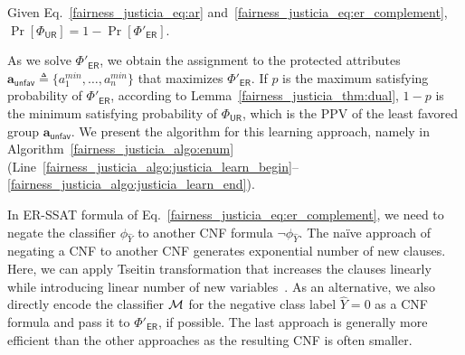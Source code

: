 \begin{lemma}\label{fairness_justicia_thm:dual}
Given Eq.~\eqref{fairness_justicia_eq:ar} and~\eqref{fairness_justicia_eq:er_complement},	$ \Pr[\Phi_{\mathsf{UR}}] = 1 - \Pr[\Phi'_{\mathsf{ER}}]  $.
\end{lemma}
As we solve $\Phi'_{\mathsf{ER}}$, we obtain the assignment to the protected attributes $\mathbf{a}_{\mathsf{unfav}} \triangleq \{a^{min}_1, \dots, a^{min}_n\}$ that maximizes $\Phi'_{\mathsf{ER}}$. 
If $ p $ is the maximum satisfying probability of $ \Phi'_{\mathsf{ER}} $, according to Lemma~\ref{fairness_justicia_thm:dual}, $ 1 - p $ is the minimum satisfying probability of $ \Phi_{\mathsf{UR}} $,  which is the PPV of the least favored group $ \mathbf{a}_{\mathsf{unfav}}$. We present the algorithm for this learning approach, namely {\justicialearn} in Algorithm~\ref{fairness_justicia_algo:enum} (Line~\ref{fairness_justicia_algo:justicia_learn_begin}--\ref{fairness_justicia_algo:justicia_learn_end}).

\iffalse
\begin{algorithm}[t!]
	\caption{\justicialearn: Learning ER-SSAT Encoding}
	\label{fairness_justicia_algo:learn}
	\begin{algorithmic}[1]
		\Function{{\justicialearn}}{$ X,A,\hat{Y} $}
		\State $ \phi_{\hat{Y}} = \mathsf{CNF}(\hat{Y}  = 1) $
		\State $ p_{i} = \mathsf{CalculateProb}(x_i), \forall x_i \in X $
		\State $  \Phi_\mathbf{ER} = \exists a_1,\dots, \exists a_n, \R^{p_{1}}x_1, \dots, \R^{p_{m}}x_m. \; \phi_{\hat{Y}} $
		\State $  \Phi'_\mathbf{ER} = \exists a_1,\dots, \exists a_n, \R^{p_{1}}x_1, \dots, \R^{p_{m}}x_m. \; \neg \phi_{\hat{Y}} $
		\State \Return $ \mathsf{SSAT}(\Phi_\mathbf{ER}), 1 - \mathsf{SSAT}(\Phi'_\mathbf{ER}) $
		\EndFunction
	\end{algorithmic}
\end{algorithm}
\fi

In ER-SSAT formula of Eq.~\eqref{fairness_justicia_eq:er_complement}, we need to negate the classifier $ \phi_{\hat{Y}} $ to another CNF formula $ \neg \phi_{\hat{Y}} $. The na\"ive approach of negating a CNF to another CNF generates exponential number of new clauses. Here, we can apply Tseitin transformation that increases the clauses linearly while introducing linear number of new variables~\cite{tseitin1983complexity}. As an alternative, we also directly encode the classifier $\mathcal{M}$ for the negative class label $\hat{Y} = 0$ as a CNF formula and pass it to $\Phi'_{\mathsf{ER}} $, if possible. The last approach is generally more efficient than the other approaches as the resulting CNF is often smaller. 



